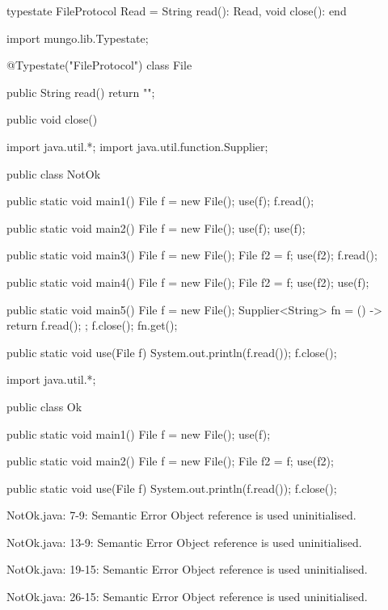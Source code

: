 \begin{code}
typestate FileProtocol {
  Read = {
    String read(): Read,
    void close(): end
  }
}\end{code}

\begin{code}
import mungo.lib.Typestate;

@Typestate("FileProtocol")
class File {

  public String read() {
    return "";
  }

  public void close() {
  }

}\end{code}

\begin{code}
import java.util.*;
import java.util.function.Supplier;

public class NotOk {
  public static void main1() {
    File f = new File();
    use(f);
    f.read();
  }

  public static void main2() {
    File f = new File();
    use(f);
    use(f);
  }

  public static void main3() {
    File f = new File();
    File f2 = f;
    use(f2);
    f.read();
  }

  public static void main4() {
    File f = new File();
    File f2 = f;
    use(f2);
    use(f);
  }

  public static void main5() {
    File f = new File();
    Supplier<String> fn = () -> {
      return f.read();
    };
    f.close();
    fn.get();
  }

  public static void use(File f) {
    System.out.println(f.read());
    f.close();
  }
}\end{code}

\begin{code}
import java.util.*;

public class Ok {
  public static void main1() {
    File f = new File();
    use(f);
  }

  public static void main2() {
    File f = new File();
    File f2 = f;
    use(f2);
  }

  public static void use(File f) {
    System.out.println(f.read());
    f.close();
  }
}\end{code}

\lstset{caption=Original Mungo output}
\begin{code}

NotOk.java: 7-9: Semantic Error
		Object reference is used uninitialised.

NotOk.java: 13-9: Semantic Error
		Object reference is used uninitialised.

NotOk.java: 19-15: Semantic Error
		Object reference is used uninitialised.

NotOk.java: 26-15: Semantic Error
		Object reference is used uninitialised.
\end{code}

